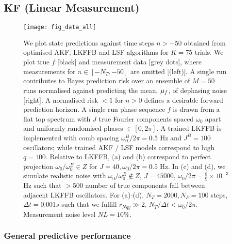 \subsection{KF (Linear Measurement)}
\begin{figure}
    \texttt{[image: fig\_data\_all]}
    \caption{\label{fig:main:fig_data_all} We plot state predictions against time steps $n > -50$ obtained from optimised AKF, LKFFB and LSF algorithms for $K=75$ trials. We plot true $f$ [black] and measurement data [grey dots], where measurements for $n \in [-N_T, -50]$ are omitted [(left)]. A single run contributes to Bayes prediction risk over an ensemble of $M=50$ runs normalised against predicting the mean, $\mu_f$, of dephasing noise [right]. A normalised risk $<1$ for $n > 0$ defines a desirable forward prediction horizon. A single run phase sequence $f$ is drawn from a flat top spectrum with $J$ true Fourier components spaced $\omega_0$ apart and uniformly randomised phases $\in [0, 2\pi]$. A trained LKFFB is implemented with comb spacing $\omega_0^B / 2\pi = 0.5$ Hz and $J^B =100$ oscillators; while trained AKF / LSF models correspond to high $q = 100$. Relative to LKFFB,  (a) and (b) correspond to perfect projection $\omega_0 / \omega_0^B  \in Z $ for $J= 40, \omega_0 / 2\pi = 0.5$ Hz. In (c) and (d), we simulate realistic noise with $\omega_0 / \omega_0^B  \notin Z$, $J = 45000$, $\omega_0 / 2\pi = \frac{8}{9} \times 10^{-3}$ Hz such that $>500$ number of true components fall between adjacent LKFFB oscillators. For (a)-(d), $N_T = 2000, N_P = 100$ steps, $\Delta t = 0.001s$ such that we fulfill $r_{Nqy} \gg 2$, $N_T / \Delta t < \omega_0/2\pi$. Measurement noise level $ NL= 10\%$.}
\end{figure} 

\subsubsection{General predictive performance}

